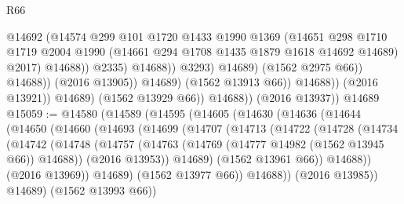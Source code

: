 \begin{lexlean}{R66}
\begin{coremodule}
                                            @14692
                                            (@14574
                                              @299
                                              @101
                                              @1720
                                              @1433
                                              @1990
                                              @1369
                                              (@14651
                                                @298
                                                @1710
                                                @1719
                                                @2004
                                                @1990
                                                (@14661 @294 @1708 @1435 @1879 @1618 @14692 @14689)
                                                @2017)
                                              @14688))
                                          @2335)
                                        @14688))
                                    @3293)
                                  @14689)
                                (@1562 @2975 @66))
                              @14688))
                          (@2016 @13905))
                        @14689)
                      (@1562 @13913 @66))
                    @14688))
                (@2016 @13921))
              @14689)
            (@1562 @13929 @66))
          @14688))
      (@2016 @13937))
    @14689
@15059 := @14580
    (@14589
      (@14595
        (@14605
          (@14630
            (@14636
              (@14644
                (@14650
                  (@14660
                    (@14693
                      (@14699
                        (@14707
                          (@14713
                            (@14722
                              (@14728
                                (@14734
                                  (@14742
                                    (@14748
                                      (@14757
                                        (@14763 (@14769 (@14777 @14982 (@1562 @13945 @66)) @14688))
                                        (@2016 @13953))
                                      @14689)
                                    (@1562 @13961 @66))
                                  @14688))
                              (@2016 @13969))
                            @14689)
                          (@1562 @13977 @66))
                        @14688))
                    (@2016 @13985))
                  @14689)
                (@1562 @13993 @66))

\end{coremodule}
\end{lexlean}

